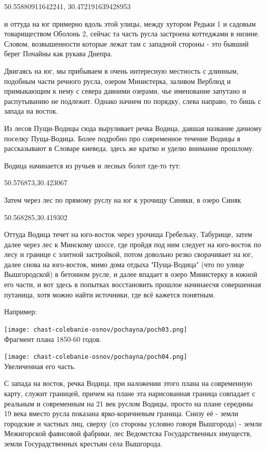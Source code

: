 50.55880911642241, 30.472191639428953

и оттуда на юг примерно вдоль этой улицы, между хутором Редьки 1 и садовым товариществом Оболонь 2, сейчас та часть русла застроена коттеджами в низине. Словом, возвышенности которые лежат там с западной стороны - это бывший берег Почайны как рукава Днепра.

Двигаясь на юг, мы прибываем в очень интересную местность с длинным, подобным части речного русла, озером Министерка, заливом Верблюд и примыкающим к нему с севера давними озерами, чье именование запутано и распутыванию не подлежит. Однако начнем по порядку, слева направо, то бишь с запада на восток.

Из лесов Пущи-Водицы сюда выруливает речка Водица, давшая название дачному поселку Пуща-Водица. Более подробно про современное течение Водицы я рассказывают в Словаре киеведа, здесь же кратко и уделю внимание прошлому.

Водица начинается из ручьев и лесных болот где-то тут:

50.576873,30.423067

Затем через лес по прямому руслу на юг к урочищу Синяки, в озеро Синяк

50.568285,30.419302

Оттуда Водица течет на юго-восток через урочища Гребельку, Табурище, затем далее через лес к Минскому шоссе, где пройдя под ним следует на юго-восток по лесу и границе с элитной застройкой, потом довольно резко сворачивает на юг, далее снова на юго-восток, мимо дома отдыха "Пуща-Водица" (что по улице Вышгородской) в бетонном русле, и далее впадает в озеро Министерку в южной его части, и вот здесь в попытках восстановить прошлое начинаесчя совершенная путаница, хотя можно найти источники, где всё кажется понятным.

Например:

\begin{center}
\texttt{[image: chast-colebanie-osnov/pochayna/poch03.png]}\\

Фрагмент плана 1850-60 годов.
\end{center}

\begin{center}
\texttt{[image: chast-colebanie-osnov/pochayna/poch04.png]}\\

Увеличенная его часть.
\end{center}

С запада на восток, речка Водица, при наложении этого плана на современную карту, служит границей, причем на плане эта нарисованная граница совпадает с реальным и современным на 21 век руслом Водицы, просто на плане середины 19 века вместо русла показана ярко-коричневым граница. Снизу её - земли городские и частных лиц, сверху (со стороны условно говоря Вышгорода) - земли Межигорской фаянсовой фабрики, лес Ведомстсва Государственных имуществ, земли Госурадственных крестьян села Вышгорода.

